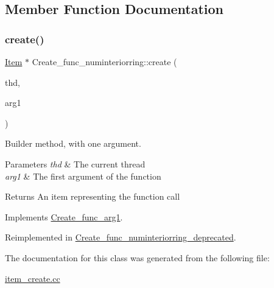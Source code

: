 \subsection{Member Function Documentation}
\mbox{\label{classCreate__func__numinteriorring_a2a90d2b7363055fd384130f09e5bc5c6}} 
\subsubsection{\texorpdfstring{create()}{create()}}
{\footnotesize\ttfamily \mbox{\hyperlink{classItem}{Item}} $\ast$ Create\+\_\+func\+\_\+numinteriorring\+::create (\begin{DoxyParamCaption}\item[{T\+HD $\ast$}]{thd,  }\item[{\mbox{\hyperlink{classItem}{Item}} $\ast$}]{arg1 }\end{DoxyParamCaption})\hspace{0.3cm}{\ttfamily [virtual]}}

Builder method, with one argument. 
\begin{DoxyParams}{Parameters}
{\em thd} & The current thread \\
\hline
{\em arg1} & The first argument of the function \\
\hline
\end{DoxyParams}
\begin{DoxyReturn}{Returns}
An item representing the function call 
\end{DoxyReturn}


Implements \mbox{\hyperlink{classCreate__func__arg1_a3e9a98f755cd82c3e762e334c955a8c9}{Create\+\_\+func\+\_\+arg1}}.



Reimplemented in \mbox{\hyperlink{classCreate__func__numinteriorring__deprecated_a7c9be02046e6dc03903ee77b2f103b88}{Create\+\_\+func\+\_\+numinteriorring\+\_\+deprecated}}.



The documentation for this class was generated from the following file\+:\begin{DoxyCompactItemize}
\item 
\mbox{\hyperlink{item__create_8cc}{item\+\_\+create.\+cc}}\end{DoxyCompactItemize}
